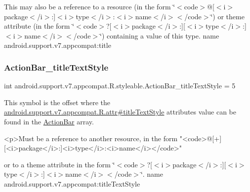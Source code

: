 This may also be a reference to a resource (in the form \char`\"{}$<$code$>$@\mbox{[}$<$i$>$package$<$/i$>$\+:\mbox{]}$<$i$>$type$<$/i$>$\+:$<$i$>$name$<$/i$>$$<$/code$>$\char`\"{}) or theme attribute (in the form \char`\"{}$<$code$>$?\mbox{[}$<$i$>$package$<$/i$>$\+:\mbox{]}\mbox{[}$<$i$>$type$<$/i$>$\+:\mbox{]}$<$i$>$name$<$/i$>$$<$/code$>$\char`\"{}) containing a value of this type.  name android.\+support.\+v7.\+appcompat\+:title \mbox{\label{classandroid_1_1support_1_1v7_1_1appcompat_1_1R_1_1styleable_a488241f95872a905692b67f683e04ce5}} 
\subsubsection{\texorpdfstring{Action\+Bar\+\_\+title\+Text\+Style}{ActionBar\_titleTextStyle}}
{\footnotesize\ttfamily int android.\+support.\+v7.\+appcompat.\+R.\+styleable.\+Action\+Bar\+\_\+title\+Text\+Style = 5\hspace{0.3cm}{\ttfamily [static]}}

This symbol is the offset where the \hyperlink{classandroid_1_1support_1_1v7_1_1appcompat_1_1R_1_1attr_a736fcf06e75745b6eb862450e360d947}{android.\+support.\+v7.\+appcompat.\+R.\+attr\#title\+Text\+Style} attribute\textquotesingle{}s value can be found in the \hyperlink{classandroid_1_1support_1_1v7_1_1appcompat_1_1R_1_1styleable_a5941dc15714398e9ec9afaa0155cc1cf}{Action\+Bar} array.

\begin{DoxyVerb}      <p>Must be a reference to another resource, in the form "<code>@[+][<i>package</i>:]<i>type</i>:<i>name</i></code>"
\end{DoxyVerb}
 or to a theme attribute in the form \char`\"{}$<$code$>$?\mbox{[}$<$i$>$package$<$/i$>$\+:\mbox{]}\mbox{[}$<$i$>$type$<$/i$>$\+:\mbox{]}$<$i$>$name$<$/i$>$$<$/code$>$\char`\"{}.  name android.\+support.\+v7.\+appcompat\+:title\+Text\+Style \mbox{\label{classandroid_1_1support_1_1v7_1_1appcompat_1_1R_1_1styleable_a130715398cd11a55fefd1a376c18092e}} 
